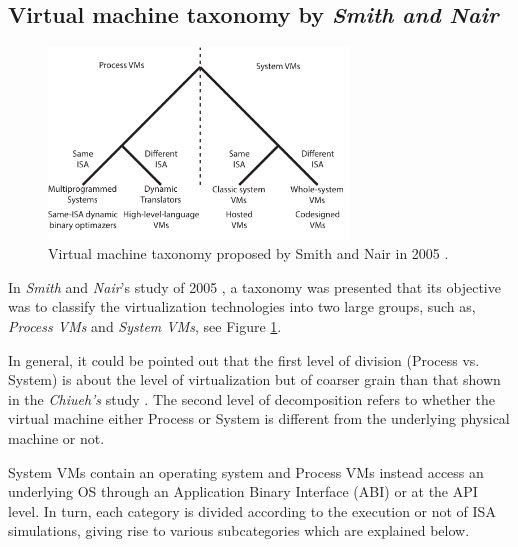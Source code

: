 	\subsection{Virtual machine taxonomy by \textit{Smith and Nair}}
	
	\begin{figure}[!hbtp]
		\centering
		\includegraphics[width=8cm]{images/Smith2005.pdf}
		\vspace{-0.2cm}
		\caption{Virtual machine taxonomy proposed by Smith and Nair in 2005 \footnotemark [4]{}.}
		\label{fig:VMTaxonomySmithNair2005}
	\end{figure}
	
	
	In \textit{Smith} and \textit{Nair}'s study of 2005 \cite {Smith2005}, a taxonomy was presented that its objective was to classify the virtualization technologies into two large groups, such as, \textit{Process VMs} and \textit{System VMs}, see Figure \ref{fig:VMTaxonomySmithNair2005}. 
	
	 In general, it could be pointed out that the first level of division (Process vs. System) is about the level of virtualization but of coarser grain than that shown in the \textit{Chiueh's} study \cite{Chiueh2005}. The second level of decomposition refers to whether the virtual machine either Process or System is different from the underlying physical machine or not. 
    
    System VMs contain an operating system and Process VMs instead access an underlying OS through an Application Binary Interface (ABI) or at the API level. In turn, each category is divided according to the execution or not of ISA simulations, giving rise to various subcategories which are explained below.
	
    
